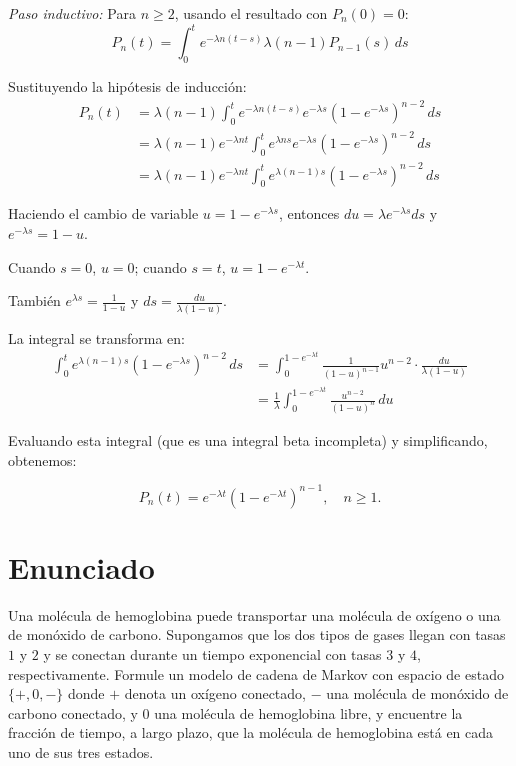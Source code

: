 \documentclass[10pt]{article}
\begin{document}
\textit{Paso inductivo:} Para $n \geq 2$, usando el resultado con $P_n(0) = 0$:
\begin{equation*}
P_n(t) = \int_0^t e^{-\lambda n (t - s)} \lambda (n-1) P_{n-1}(s) \, ds
\end{equation*}

Sustituyendo la hipótesis de inducción:
\begin{align*}
P_n(t) &= \lambda (n-1) \int_0^t e^{-\lambda n (t - s)} e^{-\lambda s} (1 - e^{-\lambda s})^{n-2} \, ds \\
&= \lambda (n-1) e^{-\lambda n t} \int_0^t e^{\lambda n s} e^{-\lambda s} (1 - e^{-\lambda s})^{n-2} \, ds \\
&= \lambda (n-1) e^{-\lambda n t} \int_0^t e^{\lambda (n-1)s} (1 - e^{-\lambda s})^{n-2} \, ds
\end{align*}

Haciendo el cambio de variable $u = 1 - e^{-\lambda s}$, entonces $du = \lambda e^{-\lambda s} ds$ y $e^{-\lambda s} = 1-u$.

Cuando $s = 0$, $u = 0$; cuando $s = t$, $u = 1 - e^{-\lambda t}$.

También $e^{\lambda s} = \frac{1}{1-u}$ y $ds = \frac{du}{\lambda(1-u)}$.

La integral se transforma en:
\begin{align*}
\int_0^t e^{\lambda (n-1)s} (1 - e^{-\lambda s})^{n-2} \, ds &= \int_0^{1-e^{-\lambda t}} \frac{1}{(1-u)^{n-1}} u^{n-2} \cdot \frac{du}{\lambda(1-u)} \\
&= \frac{1}{\lambda} \int_0^{1-e^{-\lambda t}} \frac{u^{n-2}}{(1-u)^n} \, du
\end{align*}

Evaluando esta integral (que es una integral beta incompleta) y simplificando, obtenemos:

\begin{equation*}
\boxed{P_n(t) = e^{-\lambda t} (1 - e^{-\lambda t})^{n-1}, \quad n \geq 1.}
\end{equation*}

\section*{Enunciado}

Una molécula de hemoglobina puede transportar una molécula de oxígeno o una de monóxido de carbono. Supongamos que los dos tipos de gases llegan con tasas $1$ y $2$ y se conectan durante un tiempo exponencial con tasas $3$ y $4$, respectivamente. Formule un modelo de cadena de Markov con espacio de estado $\{+, 0, -\}$ donde $+$ denota un oxígeno conectado, $-$ una molécula de monóxido de carbono conectado, y $0$ una molécula de hemoglobina libre, y encuentre la fracción de tiempo, a largo plazo, que la molécula de hemoglobina está en cada uno de sus tres estados.
\end{document}
